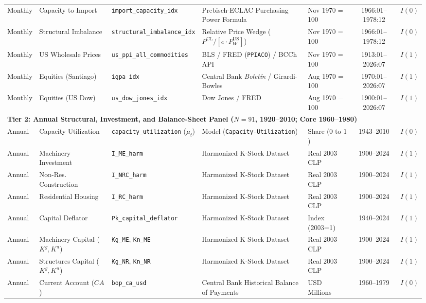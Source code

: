 \begin{table}[htbp]
{\begin{tabular}{lllllcc}
Monthly & Capacity to Import & \texttt{import\_capacity\_idx} & Prebisch-ECLAC Purchasing Power Formula & Nov 1970 = 100 & 1966:01--1978:12 & $I(0)$ \\
Monthly & Structural Imbalance & \texttt{structural\_imbalance\_idx} & Relative Price Wedge ($P^{\text{CL}} / [e \cdot P^{\text{US}}_W]$) & Nov 1970 = 100 & 1966:01--1978:12 & $I(0)$ \\
Monthly & US Wholesale Prices & \texttt{us\_ppi\_all\_commodities} & BLS / FRED (\texttt{PPIACO}) / BCCh API & Nov 1970 = 100 & 1913:01--2026:07 & $I(1)$ \\
Monthly & Equities (Santiago) & \texttt{igpa\_idx} & Central Bank \textit{Boletín} / Girardi-Bowles & Aug 1970 = 100 & 1970:01--2026:07 & $I(1)$ \\
Monthly & Equities (US Dow) & \texttt{us\_dow\_jones\_idx} & Dow Jones / FRED & Aug 1970 = 100 & 1900:01--2026:07 & $I(1)$ \\
\midrule
\multicolumn{7}{l}{\textbf{Tier 2: Annual Structural, Investment, and Balance-Sheet Panel ($N = 91$, 1920--2010; Core 1960--1980)}} \\[0.2em]
Annual & Capacity Utilization & \texttt{capacity\_utilization} ($\mu_t$) & \citet{Polanco2026} Model (\texttt{Capacity-Utilization}) & Share ($0$ to $1$) & 1943--2010 & $I(0)$ \\
Annual & Machinery Investment & \texttt{I\_ME\_harm} & \citet{Polanco2026} Harmonized K-Stock Dataset & Real 2003 CLP & 1900--2024 & $I(1)$ \\
Annual & Non-Res. Construction & \texttt{I\_NRC\_harm} & \citet{Polanco2026} Harmonized K-Stock Dataset & Real 2003 CLP & 1900--2024 & $I(1)$ \\
Annual & Residential Housing & \texttt{I\_RC\_harm} & \citet{Polanco2026} Harmonized K-Stock Dataset & Real 2003 CLP & 1900--2024 & $I(1)$ \\
Annual & Capital Deflator & \texttt{Pk\_capital\_deflator} & \citet{Polanco2026} Harmonized K-Stock Dataset & Index (2003=1) & 1940--2024 & $I(1)$ \\
Annual & Machinery Capital ($K^g, K^n$) & \texttt{Kg\_ME}, \texttt{Kn\_ME} & \citet{Polanco2026} Harmonized K-Stock Dataset & Real 2003 CLP & 1900--2024 & $I(1)$ \\
Annual & Structures Capital ($K^g, K^n$) & \texttt{Kg\_NR}, \texttt{Kn\_NR} & \citet{Polanco2026} Harmonized K-Stock Dataset & Real 2003 CLP & 1900--2024 & $I(1)$ \\
Annual & Current Account ($CA$) & \texttt{bop\_ca\_usd} & Central Bank Historical Balance of Payments & USD Millions & 1960--1979 & $I(0)$ \\

\end{tabular}}
\end{table}
